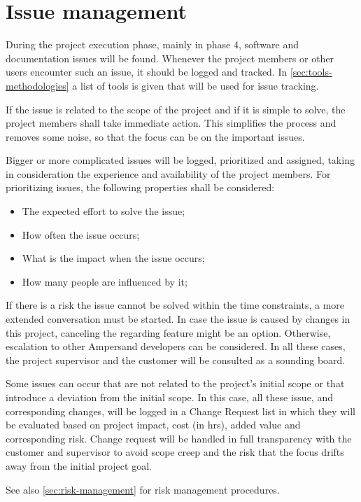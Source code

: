 
\section{Issue management}
\label{sec:issue-management}
During the project execution phase, mainly in phase 4, software and documentation issues will be found.
Whenever the project members or other users encounter such an issue, it should be logged and tracked.
In \autoref{sec:tools-methodologies} a list of tools is given that will be used for issue tracking.

If the issue is related to the scope of the project and if it is simple to solve, the project members shall take immediate action.
This simplifies the process and removes some noise, so that the focus can be on the important issues.

Bigger or more complicated issues will be logged, prioritized and assigned, taking in consideration the experience and availability of the project members.
For prioritizing issues, the following properties shall be considered:
\begin{itemize}
	\item The expected effort to solve the issue;
	\item How often the issue occurs;
	\item What is the impact when the issue occurs;
	\item How many people are influenced by it;
\end{itemize}

If there is a risk the issue cannot be solved within the time constraints, a more extended conversation must be started.
In case the issue is caused by changes in this project, canceling the regarding feature might be an option.
Otherwise, escalation to other Ampersand developers can be considered.
In all these cases, the project supervisor and the customer will be consulted as a sounding board.

Some issues can occur that are not related to the project's initial scope or that introduce a deviation from the initial scope.
In this case, all these issue, and corresponding changes, will be logged in a Change Request list in which they will be evaluated based on project impact, cost (in hrs), added value and corresponding risk. 
Change request will be handled in full transparency with the customer and supervisor to avoid scope creep and the risk that the focus drifts away from the initial project goal.

See also \autoref{sec:risk-management} for risk management procedures.
